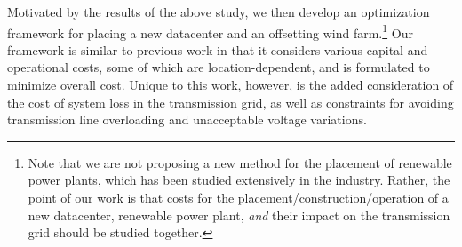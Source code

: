 

Motivated by the results of the above study, we then develop an
optimization framework for placing a new datacenter and an offsetting
wind farm.\footnote{Note that we are not proposing a new method for
  the placement of renewable power plants, which has been studied
  extensively in the industry.  Rather, the point of our work is that
  costs for the placement/construction/operation of a new datacenter,
  renewable power plant, {\em and} their impact on the transmission
  grid should be studied together.}  Our framework is similar to
previous work in that it considers various capital and operational
costs, some of which are location-dependent, and is formulated to
minimize overall cost.  Unique to this work, however, is the added
consideration of the cost of system loss in the transmission grid, as
well as constraints for avoiding transmission line overloading and
unacceptable voltage variations.

